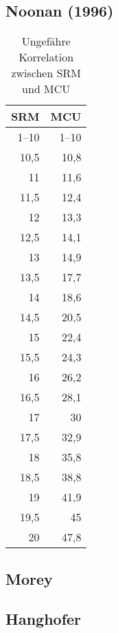 \documentclass[a4paper,parskip=half]{scrartcl}
\begin{document}
\parencite[10]{Holle2010}

\subsection*{Noonan (1996)}

\begin{table}[H]
\centering
\begin{tabular}{rr}
\toprule
\multicolumn{1}{c}{\textbf{SRM}} & \multicolumn{1}{c}{\textbf{MCU}} \\
\midrule
1–10 & 1–10 \\
10,5 & 10,8 \\
11   & 11,6 \\
11,5 & 12,4 \\
12   & 13,3 \\
12,5 & 14,1 \\
13   & 14,9 \\
13,5 & 17,7 \\
14   & 18,6 \\
14,5 & 20,5 \\
15   & 22,4 \\
15,5 & 24,3 \\
16   & 26,2 \\
16,5 & 28,1 \\
17   & 30 \\
17,5 & 32,9 \\
18   & 35,8 \\
18,5 & 38,8 \\
19   & 41,9 \\
19,5 & 45 \\
20   & 47,8 \\
\bottomrule
\end{tabular}
\caption{Ungefähre Korrelation zwischen SRM und MCU \parencite[206]{Noonan1996}}
\label{table:noonanmcu}
\end{table}

\parencite{Druey1998}

\subsection*{Morey}


\parencite{Morey}
\parencite{Smith2010}

\subsection*{Hanghofer}

\parencite[78]{Hanghofer2019}
\end{document}
